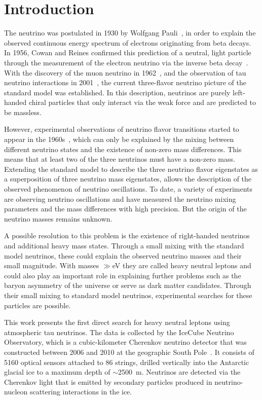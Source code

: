\setchapterpreamble[u]{\margintoc}

\chapter{Introduction}

The neutrino was postulated in 1930 by Wolfgang Pauli~, in order to explain the observed continuous energy spectrum of electrons originating from beta decays. In 1956, Cowan and Reines confirmed this prediction of a neutral, light particle through the measurement of the electron neutrino via the inverse beta decay~. With the discovery of the muon neutrino in 1962~, and the observation of tau neutrino interactions in 2001~, the current three-flavor neutrino picture of the standard model was established. In this description, neutrinos are purely left-handed chiral particles that only interact via the weak force and are predicted to be massless.

However, experimental observations of neutrino flavor transitions started to appear in the 1960s~, which can only be explained by the mixing between different neutrino states and the existence of non-zero mass differences. This means that at least two of the three neutrinos must have a non-zero mass. Extending the standard model to describe the three neutrino flavor eigenstates as a superposition of three neutrino mass eigenstates, allows the description of the observed phenomenon of neutrino oscillations. To date, a variety of experiments are observing neutrino oscillations and have measured the neutrino mixing parameters and the mass differences with high precision. But the origin of the neutrino masses remains unknown.

A possible resolution to this problem is the existence of right-handed neutrinos and additional heavy mass states. Through a small mixing with the standard model neutrinos, these could explain the observed neutrino masses and their small magnitude. With masses $\gg$\si{\electronvolt} they are called heavy neutral leptons and could also play an important role in explaining further problems such as the baryon asymmetry of the universe or serve as dark matter candidates. Through their small mixing to standard model neutrinos, experimental searches for these particles are possible.

This work presents the first direct search for heavy neutral leptons using atmospheric tau neutrinos. The data is collected by the IceCube Neutrino Observatory, which is a cubic-kilometer Cherenkov neutrino detector that was constructed between 2006 and 2010 at the geographic South Pole~. It consists of 5160 optical sensors attached to 86 strings, drilled vertically into the Antarctic glacial ice to a maximum depth of $\sim$\SI{2500}{\meter}. Neutrinos are detected via the Cherenkov light that is emitted by secondary particles produced in neutrino-nucleon scattering interactions in the ice.

